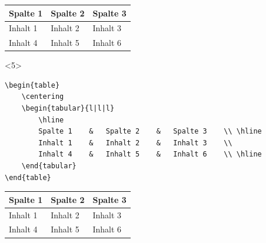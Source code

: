 \documentclass["WS\space 16-17\space -\space LaTeX-Kurs\space -\space Praesentation\space -\space 2.tex"]{subfiles}
\begin{document}
\begin{frame}[fragile]
\begin{onlyenv}
\begin{outputbox}
			\begin{table}
				\centering
				\begin{tabular}{lll}
					\hline
					Spalte 1	&	Spalte 2	&	Spalte 3	\\ \hline
					Inhalt 1	&	Inhalt 2	&	Inhalt 3	\\
					Inhalt 4	&	Inhalt 5	&	Inhalt 6	\\ \hline	
				\end{tabular}
			\end{table}
		\end{outputbox}
	\end{onlyenv}
	\begin{onlyenv}
		\Code
		\begin{lstlisting}
\begin{table}
	\centering
	\begin{tabular}{l|l|l}
		\hline
		Spalte 1	&	Spalte 2	&	Spalte 3	\\ \hline
		Inhalt 1	&	Inhalt 2	&	Inhalt 3	\\
		Inhalt 4	&	Inhalt 5	&	Inhalt 6	\\ \hline
	\end{tabular}
\end{table}
		\end{lstlisting}
		\Ausgabe
		\begin{outputbox}
			\begin{table}
				\centering
				\begin{tabular}{l|l|l}
					\hline
					Spalte 1	&	Spalte 2	&	Spalte 3	\\ \hline
					Inhalt 1	&	Inhalt 2	&	Inhalt 3	\\
					Inhalt 4	&	Inhalt 5	&	Inhalt 6	\\ \hline	
				\end{tabular}
			\end{table}
		\end{outputbox}
	\end{onlyenv}
\end{frame}
\end{document}

